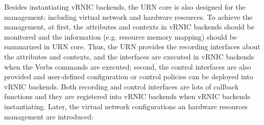 Besides instantiating vRNIC backends, the URN core is also designed for the management: including virtual network and hardware resources. To achieve the management, at first, the attributes and contexts in vRNIC backends should be monitored and the information (e.g. resource memory mapping) should be summarized in URN core. Thus, the URN provides the recording interfaces about the attributes and contexts, and the interfaces are executed in vRNIC backends when the Verbs commands are executed; 
second, the control interfaces are also provided and user-defined configuration or control policies can be deployed into vRNIC backends. Both recording and control interfaces are lots of callback functions and they are registered into vRNIC backends when vRNIC backends instantiating. Later, the virtual network configurations an hardware resources management are introduced:

